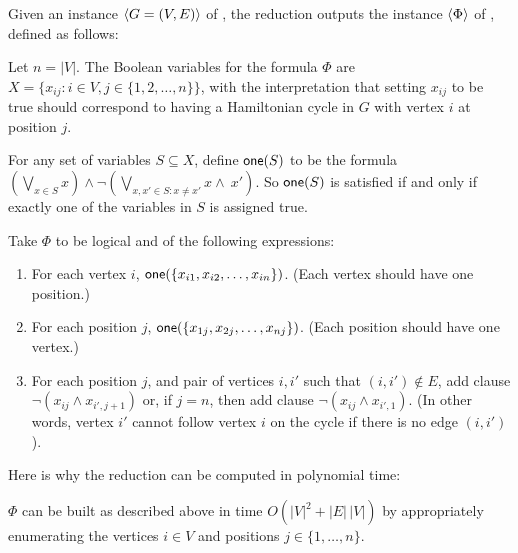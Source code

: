 \documentclass[11pt]{article}
\begin{document}
\begin{problems}

  \newpage
  \problem %

  Given an instance $\langle G=(V,E) \rangle$ of ,
  the reduction outputs the instance $\langle \Phi \rangle$ of , defined as follows:
  
  \lineacross 

  Let $n=|V|$.
  The Boolean variables for the formula $\Phi$ are $X=\{x_{ij} : i\in V, j\in\{1,2,\ldots,n\}\}$,
  with the interpretation that setting $x_{ij}$ to be true should correspond to having
  a Hamiltonian cycle in $G$ with vertex $i$ at position $j$.

  \newcommand{\one}{\mbox{\sf one}}
  For any set of variables $S\subseteq X$, define $\one(S)$
  to be the formula $(\bigvee_{x \in S} x) \wedge \neg (\bigvee_{x,x'\in S: x\ne x'} x \wedge \ x')$.
  So $\one(S)$ is satisfied
  if and only if exactly one of the variables in $S$ is assigned true.

  Take $\Phi$ to be logical and of the following expressions:
  \begin{enumerate}
  \item For each vertex $i$, $\one(\{x_{i1}, x_{i2}, \ldots, x_{in}\})$.
    (Each vertex should have one position.)

  \item For each position $j$, $\one(\{x_{1j}, x_{2j}, \ldots, x_{nj}\})$.
    (Each position should have one vertex.)

  \item For each position $j$, and pair of vertices $i, i'$ such that $(i,i')\not\in E$,
    add clause $\neg (x_{ij} \wedge x_{i',j+1})$
    or, if $j=n$, then add clause  $\neg (x_{ij} \wedge x_{i',1})$.
    (In other words, vertex $i'$ cannot follow vertex $i$ on the cycle
    if there is no edge $(i,i')$).
  \end{enumerate}
  
  \lineacross 

  \medskip 
  Here is why the reduction can be computed in polynomial time:
  
  \lineacross 
  
  $\Phi$ can be built as described above in time $O(|V|^2 + |E|\,|V|)$
  by appropriately enumerating the vertices $i\in V$ and positions $j\in\{1,\ldots,n\}$.

  \lineacross 


\end{problems}
\end{document}
